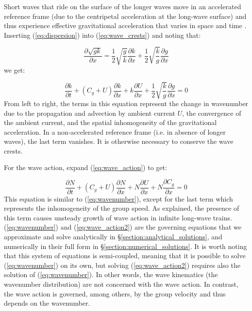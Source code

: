 \documentclass[lineno]{jfm}
\begin{document}
Short waves that ride on the surface of the longer waves move in an accelerated
reference frame (due to the centripetal acceleration at the long-wave surface)
and thus experience effective gravitational acceleration that varies in space
and time \citep{phillips1981dispersion,longuet1986eulerian,longuet1987propagation}.
Inserting (\ref{eq:dispersion}) into (\ref{eq:wave_crests}) and noting that:

\begin{equation}
\label{eq:dispersion_derivative}
\dfrac{\partial \sqrt{gk}}{\partial x} =
\dfrac{1}{2} \sqrt{\dfrac{g}{k}} \dfrac{\partial k}{\partial x} + \dfrac{1}{2} \sqrt{\dfrac{k}{g}} \dfrac{\partial g}{\partial x}
\end{equation}
we get:

\begin{equation}
\label{eq:wavenumber}
\dfrac{\partial k}{\partial t}
+ \left(C_g + U\right) \dfrac{\partial k}{\partial x}
+ k \dfrac{\partial U}{\partial x}
+ \dfrac{1}{2} \sqrt{\dfrac{k}{g}} \dfrac{\partial g}{\partial x}
= 0
\end{equation}
From left to right, the terms in this equation represent the change in wavenumber
due to the propagation and advection by ambient current $U$, the convergence of
the ambient current, and the spatial inhomogeneity of the gravitational acceleration.
In a non-accelerated reference frame (i.e. in absence of longer waves), the last
term vanishes.
It is otherwise necessary to conserve the wave crests.

For the wave action, expand (\ref{eq:wave_action}) to get:

\begin{equation}
\label{eq:wave_action2}
\dfrac{\partial N}{\partial t}
+ \left(C_g + U\right) \dfrac{\partial N}{\partial x}
+ N \dfrac{\partial U}{\partial x}
+ N \dfrac{\partial C_g}{\partial x}
= 0
\end{equation}
This equation is similar to (\ref{eq:wavenumber}), except for the last term
which represents the inhomogeneity of the group speed.
As \citet{peureux2021unsteady} explained, the presence of this term causes
unsteady growth of wave action in infinite long-wave trains.
(\ref{eq:wavenumber}) and (\ref{eq:wave_action2}) are the governing equations
that we approximate and solve analytically in \S\ref{section:analytical_solutions},
and numerically in their full form in \S\ref{section:numerical_solutions}.
It is worth noting that this system of equations is semi-coupled, meaning that
it is possible to solve (\ref{eq:wavenumber}) on its own, but solving
(\ref{eq:wave_action2}) requires also the solution of (\ref{eq:wavenumber}).
In other words, the wave kinematics (the wavenumber distribution) are not
concerned with the wave action.
In contrast, the wave action is governed, among others, by the
group velocity and thus depends on the wavenumber.
\end{document}
